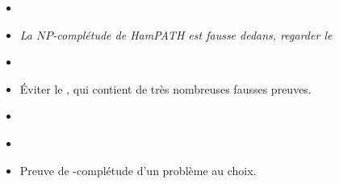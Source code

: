 \documentclass{agregfiche}
\begin{document}
\begin{itemize}
    \item 
\item 
\textit{La $NP$-complétude de HamPATH est fausse dedans, regarder le }
\item 
\item Éviter le , qui contient de très nombreuses
  fausses preuves.
\item 
\end{itemize}

\secdev

\begin{itemize}
\item 
\item Preuve de \NP-complétude d'un problème au choix.
\end{itemize}
\end{document}
